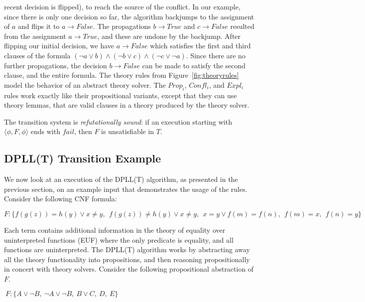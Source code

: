 \documentclass{article}
\begin{document}
	recent decision is flipped), to 
	reach the source of the conflict.
	In our example, since there is only 
	one decision so far, the algorithm
	backjumps to the assignment of 
	$a$ and flips it to $a \to False$. The 
	propagations $b \to True$ and $c \to 
	False$ resulted from the assignment 
	$a \to True$, and these are undone
	by the backjump. After flipping our 
	initial decision, we have $a \to 
	False$ which satisfies
	the first and third clauses of the 
	formula $(\neg a \lor b) \land 
	(\neg b \lor c) \land (\neg c 
	\lor \neg a)$. Since there 
	are no further propagations, the 
	decision $b \to False$ can be made 
	to satisfy the second clause, and the 
	entire formula. The theory rules
	from Figure~\ref{fig:theoryrules} model 
	the behavior of an abstract 
	theory solver. The $Prop_i$, 
	$Confl_i$, and $Expl_i$ rules
	work exactly like their 
	propositional variants, except 
	that they can use theory lemmas, 
	that are valid clauses in a 
	theory produced by the theory
	solver. 
	
	The transition system is 
	\textit{refutationally sound}:
	if an execution starting with 
	$\langle \phi, F, \phi \rangle$ ends 
	with $fail$, then $F$ is 
	unsatisfiable in $T$.
	
	\subsection{DPLL(T) Transition Example}
	\label{sec:transex}
	We now look at an execution of the 
	DPLL(T) algorithm, as presented in the 
	previous section, on an example input
	that demonstrates the usage of 
	the rules. Consider the following 
	CNF formula:
	\begin{center}
		$ F: \{f(g(z)) = h(y) \lor x \neq y,\ \ 
		f(g(z)) \neq h(y) \lor x \neq y,\ \ 
		x = y \lor f(m) = f(n),\ \ 
		f(m) = x,\ \ f(n) = y\}$
	\end{center}
	Each term contains 
	additional information in the theory 
	of equality over uninterpreted 
	functions (EUF) where the only 
	predicate is equality, and all
	functions are uninterpreted. The 
	DPLL(T) algorithm
	works by abstracting away all the 
	theory functionality into 
	propositions, and then 
	reasoning propositionally in 
	concert with theory solvers. 
	Consider the following propositional
	abstraction of $F$.
	\begin{center}
		$\ F: \{A \lor \neg B,\ \neg A \lor 
			\neg B,\ B \lor C,\ D,\ E\}$
	\end{center}
\end{document}
